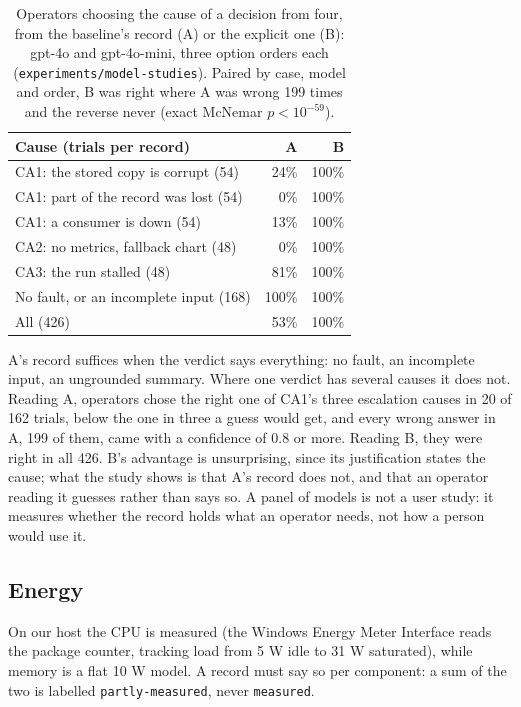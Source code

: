\documentclass[conference]{IEEEtran}
\begin{document}
\begin{table}[t]
\centering\footnotesize
\caption{Operators choosing the cause of a decision from four, from the baseline's record (A) or the explicit one (B): gpt-4o and gpt-4o-mini, three option orders each (\texttt{experiments/\allowbreak{}model-studies}). Paired by case, model and order, B was right where A was wrong 199 times and the reverse never (exact McNemar $p < 10^{-59}$).}\label{tab:4}
\begin{tabularx}{\columnwidth}{Lrr}
\toprule
Cause (trials per record) & A & B \\
\midrule
CA1: the stored copy is corrupt (54) & 24\% & 100\% \\
CA1: part of the record was lost (54) & 0\% & 100\% \\
CA1: a consumer is down (54) & 13\% & 100\% \\
CA2: no metrics, fallback chart (48) & 0\% & 100\% \\
CA3: the run stalled (48) & 81\% & 100\% \\
No fault, or an incomplete input (168) & 100\% & 100\% \\
All (426) & 53\% & 100\% \\
\bottomrule
\end{tabularx}
\end{table}

\noindent A's record suffices when the verdict says everything: no fault, an incomplete input, an ungrounded summary. Where one verdict has several causes it does not. Reading A, operators chose the right one of CA1's three escalation causes in 20 of 162 trials, below the one in three a guess would get, and every wrong answer in A, 199 of them, came with a confidence of 0.8 or more. Reading B, they were right in all 426. B's advantage is unsurprising, since its justification states the cause; what the study shows is that A's record does not, and that an operator reading it guesses rather than says so. A panel of models is not a user study: it measures whether the record holds what an operator needs, not how a person would use it.

\subsection{Energy}\label{sec:5.4}

\noindent On our host the CPU is measured (the Windows Energy Meter Interface reads the package counter, tracking load from 5 W idle to 31 W saturated), while memory is a flat 10 W model. A record must say so per component: a sum of the two is labelled \texttt{partly-measured}, never \texttt{measured}.
\end{document}
